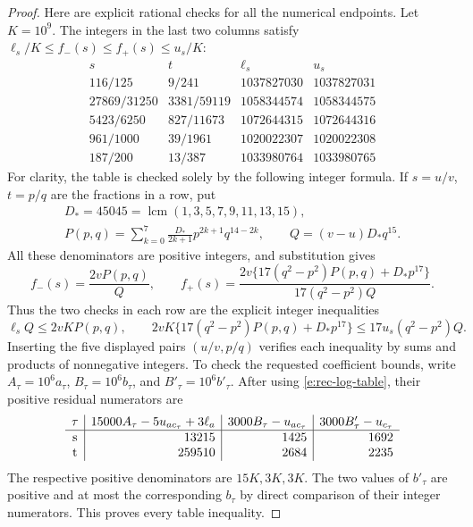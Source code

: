 \begin{proof}
Here are explicit rational checks for all the numerical endpoints.
Let \(K=10^9\).  The integers in the last two columns satisfy
\(\ell_s/K\le f_-(s)\le f_+(s)\le u_s/K\):
\begin{equation}\label{e:rec-log-table}
\begin{array}{c|c|r|r}
 s&t&\ell_s&u_s\\ \hline
 116/125&9/241&1037827030&1037827031\\
 27869/31250&3381/59119&1058344574&1058344575\\
 5423/6250&827/11673&1072644315&1072644316\\
 961/1000&39/1961&1020022307&1020022308\\
 187/200&13/387&1033980764&1033980765
\end{array}
\end{equation}
For clarity, the table is checked solely by the following integer
formula.  If \(s=u/v\), \(t=p/q\) are the fractions in a row, put
\[
 \begin{gathered}
 D_*=45045=\operatorname{lcm}(1,3,5,7,9,11,13,15),\\
 P(p,q)=\sum_{k=0}^7\frac{D_*}{2k+1}p^{2k+1}q^{14-2k},
 \qquad Q=(v-u)D_*q^{15}.
 \end{gathered}
\]
All these denominators are positive integers, and substitution gives
\[
 f_-(s)=\frac{2vP(p,q)}{Q},\qquad
 f_+(s)=\frac{2v\{17(q^2-p^2)P(p,q)+D_*p^{17}\}}
                    {17(q^2-p^2)Q}.
\]
Thus the two checks in each row are the explicit integer inequalities
\[
 \ell_sQ\le2vKP(p,q),\qquad
 2vK\{17(q^2-p^2)P(p,q)+D_*p^{17}\}
                \le17u_s(q^2-p^2)Q.
\]
Inserting the five displayed pairs \((u/v,p/q)\) verifies each
inequality by sums and products of nonnegative integers.
To check the requested coefficient bounds, write
\(A_\tau=10^6a_\tau\), \(B_\tau=10^6b_\tau\), and
\(B'_\tau=10^6b'_\tau\).  After using
\eqref{e:rec-log-table}, their positive residual numerators are
\[
\begin{array}{c|r|r|r}
 \tau&15000A_\tau-5u_{ac_\tau}+3\ell_a
       &3000B_\tau-u_{ac_\tau}&3000B'_\tau-u_{c_\tau}\\ \hline
 {\rm s}&13215&1425&1692\\
 {\rm t}&259510&2684&2235
\end{array}
\]
The respective positive denominators are \(15K,3K,3K\).
The two values of \(b'_\tau\) are positive and at most the
corresponding \(b_\tau\) by direct comparison of their integer
numerators.  This proves every table inequality.
\end{proof}

